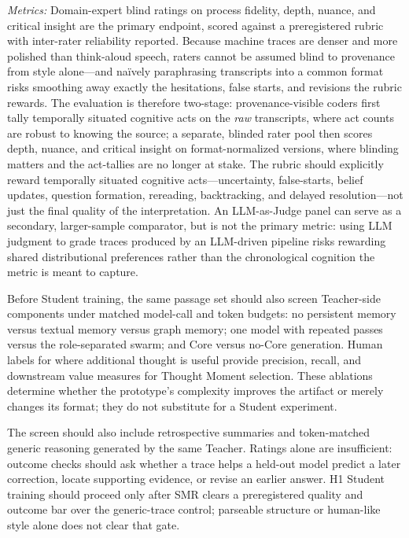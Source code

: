 \emph{Metrics:} Domain-expert blind ratings on process fidelity, depth,
nuance, and critical insight are the primary endpoint, scored against a
preregistered rubric with inter-rater reliability reported. Because machine
traces are denser and more polished than think-aloud speech, raters cannot be
assumed blind to provenance from style alone---and na\"ively paraphrasing
transcripts into a common format risks smoothing away exactly the hesitations,
false starts, and revisions the rubric rewards. The evaluation is therefore
two-stage: provenance-visible coders first tally temporally situated cognitive
acts on the \emph{raw} transcripts, where act counts are robust to knowing the
source; a separate, blinded rater pool then scores depth, nuance, and critical
insight on format-normalized versions, where blinding matters and the
act-tallies are no longer at stake. The rubric should
explicitly reward temporally situated cognitive acts---uncertainty,
false-starts, belief updates, question formation, rereading, backtracking, and
delayed resolution---not just the final quality of the interpretation. An
LLM-as-Judge panel can serve
as a secondary, larger-sample comparator, but is not the primary metric: using
LLM judgment to grade traces produced by an LLM-driven pipeline risks rewarding
shared distributional preferences rather than the chronological cognition the
metric is meant to capture.

Before Student training, the same passage set should also screen Teacher-side
components under matched model-call and token budgets: no persistent memory
versus textual memory versus graph memory; one model with repeated passes versus
the role-separated swarm; and Core versus no-Core generation. Human labels for
where additional thought is useful provide precision, recall, and downstream
value measures for Thought Moment selection. These ablations determine whether
the prototype's complexity improves the artifact or merely changes its format;
they do not substitute for a Student experiment.

The screen should also include retrospective summaries and token-matched generic
reasoning generated by the same Teacher. Ratings alone are insufficient:
outcome checks should ask whether a trace helps a held-out model predict a later
correction, locate supporting evidence, or revise an earlier answer. H1 Student
training should proceed only after SMR clears a preregistered quality and outcome
bar over the generic-trace control; parseable structure or human-like style
alone does not clear that gate.

